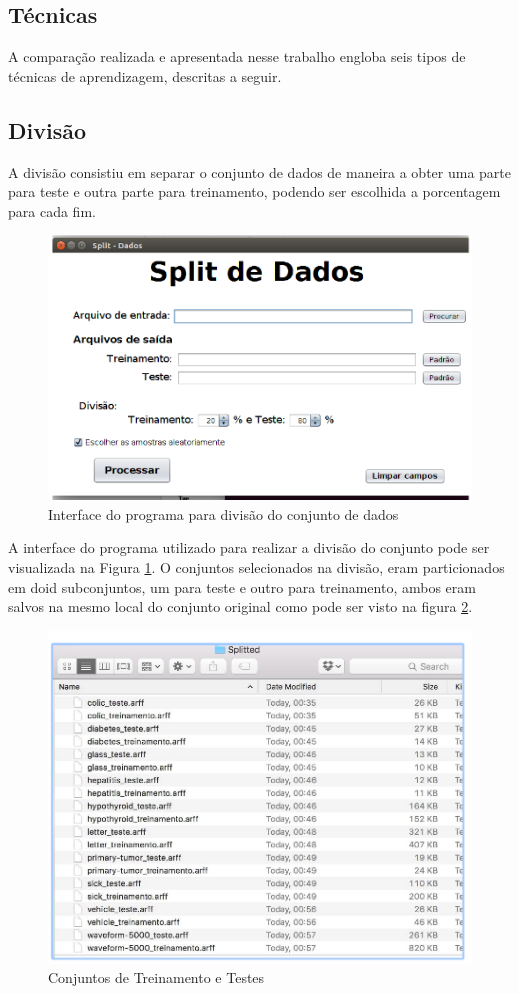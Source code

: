 \documentclass[12pt]{article}
\begin{document}
\subsection{Técnicas} \label{sec:tec}

    A comparação realizada e apresentada nesse trabalho engloba seis tipos de técnicas de aprendizagem, descritas a seguir.
    
\subsection{Divisão} \label{sec:split}

    A divisão consistiu em separar o conjunto de dados de maneira a obter uma parte para teste e outra parte para treinamento, podendo ser escolhida a porcentagem para cada fim.
    
\begin{figure}[h]
\centering
\includegraphics[width=.68\textwidth]{split.png}
\caption{Interface do programa para divisão do conjunto de dados}
\label{fig:split}
\end{figure}
        
    A interface do programa utilizado para realizar a divisão do conjunto pode ser visualizada na Figura \ref{fig:split}. O conjuntos selecionados na divisão, eram particionados em doid subconjuntos, um para teste e outro para treinamento, ambos eram salvos na mesmo local do conjunto original como pode ser visto na figura \ref{fig:splitt}.
        
\begin{figure}[h]
\centering
\includegraphics[width=.68\textwidth]{splitt.png}
\caption{Conjuntos de Treinamento e Testes}
\label{fig:splitt}
\end{figure}
    
\end{document}
